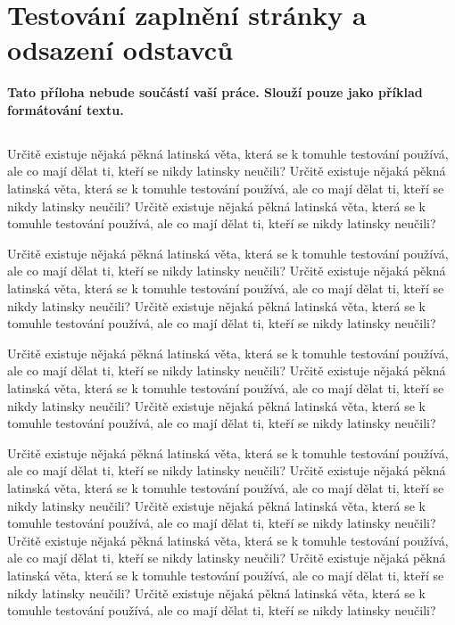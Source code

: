 \documentclass[11pt,oneside,a4paper]{book}
\begin{document}
	\appendix
	
	\chapter{Testování zaplnění stránky a odsazení odstavců}
	\textbf{\large Tato příloha nebude součástí vaší práce. 
		Slouží pouze jako příklad formátování textu.}
	
	\section*{}
	Určitě existuje nějaká pěkná latinská věta, která se k tomuhle testování používá, ale co mají dělat ti, kteří se nikdy latinsky neučili? Určitě existuje nějaká pěkná latinská věta, která se k tomuhle testování používá, ale co mají dělat ti, kteří se nikdy latinsky neučili? Určitě existuje nějaká pěkná latinská věta, která se k tomuhle testování používá, ale co mají dělat ti, kteří se nikdy latinsky neučili?
	
	Určitě existuje nějaká pěkná latinská věta, která se k tomuhle testování používá, ale co mají dělat ti, kteří se nikdy latinsky neučili? Určitě existuje nějaká pěkná latinská věta, která se k tomuhle testování používá, ale co mají dělat ti, kteří se nikdy latinsky neučili? Určitě existuje nějaká pěkná latinská věta, která se k tomuhle testování používá, ale co mají dělat ti, kteří se nikdy latinsky neučili?
	
	Určitě existuje nějaká pěkná latinská věta, která se k tomuhle testování používá, ale co mají dělat ti, kteří se nikdy latinsky neučili? Určitě existuje nějaká pěkná latinská věta, která se k tomuhle testování používá, ale co mají dělat ti, kteří se nikdy latinsky neučili? Určitě existuje nějaká pěkná latinská věta, která se k tomuhle testování používá, ale co mají dělat ti, kteří se nikdy latinsky neučili?
	
	Určitě existuje nějaká pěkná latinská věta, která se k tomuhle testování používá, ale co mají dělat ti, kteří se nikdy latinsky neučili? Určitě existuje nějaká pěkná latinská věta, která se k tomuhle testování používá, ale co mají dělat ti, kteří se nikdy latinsky neučili? Určitě existuje nějaká pěkná latinská věta, která se k tomuhle testování používá, ale co mají dělat ti, kteří se nikdy latinsky neučili? Určitě existuje nějaká pěkná latinská věta, která se k tomuhle testování používá, ale co mají dělat ti, kteří se nikdy latinsky neučili? Určitě existuje nějaká pěkná latinská věta, která se k tomuhle testování používá, ale co mají dělat ti, kteří se nikdy latinsky neučili? Určitě existuje nějaká pěkná latinská věta, která se k tomuhle testování používá, ale co mají dělat ti, kteří se nikdy latinsky neučili?
	
\end{document}
